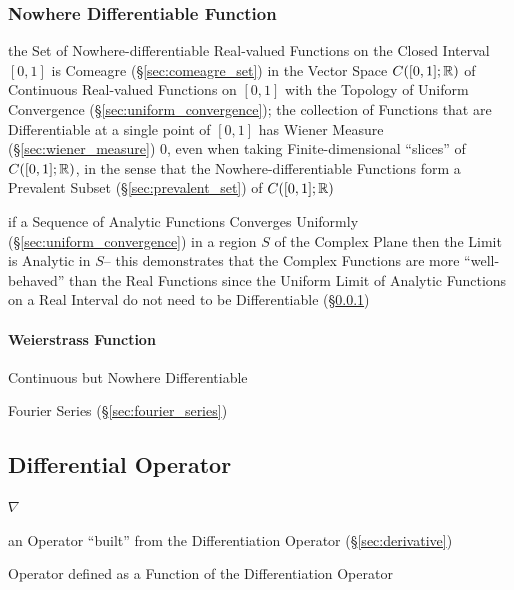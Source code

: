 {\subsubsection{Nowhere Differentiable Function}
\label{sec:nowhere_differentiable}

the Set of Nowhere-differentiable Real-valued Functions on the Closed Interval
$[0,1]$ is Comeagre (\S\ref{sec:comeagre_set}) in the Vector Space $C([0,1];
\mathbb{R})$ of Continuous Real-valued Functions on $[0,1]$ with the Topology of
Uniform Convergence (\S\ref{sec:uniform_convergence}); the collection of
Functions that are Differentiable at a single point of $[0,1]$ has Wiener
Measure (\S\ref{sec:wiener_measure}) $0$, even when taking Finite-dimensional
``slices'' of $C([0,1];\mathbb{R})$, in the sense that the Nowhere-differentiable
Functions form a Prevalent Subset (\S\ref{sec:prevalent_set}) of
$C([0,1]; \mathbb{R})$

if a Sequence of Analytic Functions Converges Uniformly
(\S\ref{sec:uniform_convergence}) in a region $S$ of the Complex Plane then the
Limit is Analytic in $S$-- this demonstrates that the Complex Functions are
more ``well-behaved'' than the Real Functions since the Uniform Limit of
Analytic Functions on a Real Interval do not need to be Differentiable
(\S\ref{sec:nowhere_differentiable})



\paragraph{Weierstrass Function}\label{sec:weierstrass_function}\hfill

Continuous but Nowhere Differentiable

Fourier Series (\S\ref{sec:fourier_series})



\subsection{Differential Operator}\label{sec:differential_operator}

$\nabla$

an Operator ``built'' from the Differentiation Operator (\S\ref{sec:derivative})

Operator defined as a Function of the Differentiation Operator

}
